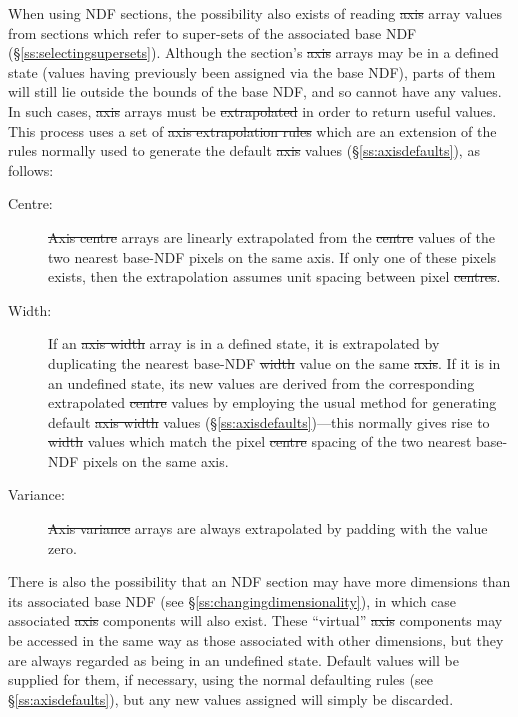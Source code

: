 When using NDF sections, the possibility also exists of reading \st{axis\/}
array values from sections which refer to super-sets of the associated base
NDF (\S\ref{ss:selectingsupersets}).
Although the section's \st{axis\/} arrays may be in a defined state (values
having previously been assigned via the base NDF), parts of them will still
lie outside the bounds of the base NDF, and so cannot have any values. 
In such cases, \st{axis\/} arrays must be \st{extrapolated\/} in order to
return useful values. 
This process uses a set of \st{axis extrapolation rules\/} which are an
extension of the rules normally used to generate the default \st{axis\/}
values (\S\ref{ss:axisdefaults}), as follows: 

\begin{description}

\item[Centre:] \st{Axis centre\/} arrays are linearly extrapolated from the
\st{centre\/} values of the two nearest base-NDF pixels on the same axis.
If only one of these pixels exists, then the extrapolation assumes unit
spacing between pixel \st{centres}. 

\item[Width:] If an \st{axis width\/} array is in a defined state, it is
extrapolated by duplicating the nearest base-NDF \st{width} value on the
same \st{axis}. 
If it is in an undefined state, its new values are derived from the
corresponding extrapolated \st{centre\/} values by employing the usual
method for generating default \st{axis width\/} values
(\S\ref{ss:axisdefaults})---this normally gives rise to \st{width\/}
values which match the pixel \st{centre\/} spacing of the two nearest
base-NDF  pixels on the same axis.

\item[Variance:] \st{Axis variance\/} arrays are always extrapolated by
padding with the value zero. 

\end{description}

There is also the possibility that an NDF section may have more dimensions
than its associated base NDF (see \S\ref{ss:changingdimensionality}), in
which case associated \st{axis\/} components will also exist. 
These ``virtual'' \st{axis\/} components may be accessed in the same way as
those associated with other dimensions, but they are always regarded as
being in an undefined state. 
Default values will be supplied for them, if necessary, using the normal
defaulting rules (see \S\ref{ss:axisdefaults}), but any new values assigned
will simply be discarded. 


